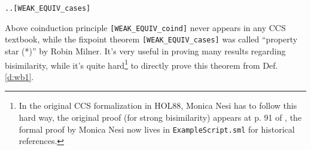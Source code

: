 \begin{enumerate}
\begin{small}
\begin{alltt}
   \HOLSymConst{\HOLTokenForall{}}.  \HOLTokenTransBegin\HOLSymConst{\ensuremath{\tau}}\HOLTokenTransEnd {} \HOLSymConst{\HOLTokenImp{}} \HOLSymConst{\HOLTokenExists{}}.  \HOLSymConst{\HOLTokenEPS}  \HOLSymConst{\HOLTokenConj{}}  \HOLSymConst{\HOLTokenWeakEQ} \hfill{[WEAK_EQUIV_cases]}
\end{alltt}
\end{small}
\end{enumerate}

Above coinduction principle \texttt{[WEAK_EQUIV_coind]} never appears in
any CCS textbook, while the fixpoint theorem
\texttt{[WEAK_EQUIV_cases]} was called ``property star (*)'' by Robin
Milner. It's very useful in proving
many results regarding bisimilarity, while it's quite hard\footnote{In
  the original CCS formalization in HOL88, Monica Nesi has to follow
  this hard way, the original proof (for strong bisimilarity) appears
  at p. 91 of \cite{Mil89}, the formal proof by Monica Nesi now lives
  in \texttt{ExampleScript.sml} for historical references.} to
directly prove this theorem from Def.\;\ref{d:wb1}.


